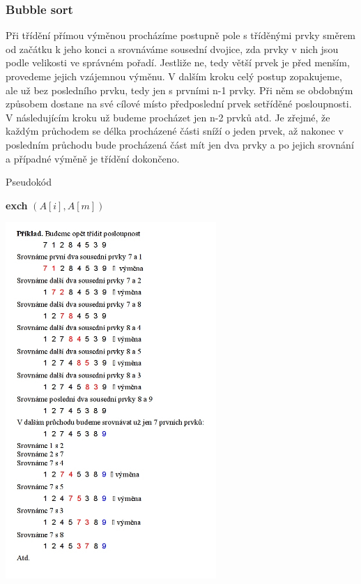 \documentclass[10pt,a4paper]{article}
\begin{document}
\subsubsection{Bubble sort}
Při třídění přímou výměnou procházíme postupně pole s tříděnými prvky směrem od začátku k jeho konci a srovnáváme sousední dvojice, zda prvky v nich jsou podle velikosti ve správném pořadí. Jestliže ne, tedy větší prvek je před menším, provedeme jejich vzájemnou výměnu. V dalším kroku celý postup zopakujeme, ale už bez posledního prvku, tedy jen s prvními n-1 prvky. Při něm se obdobným způsobem dostane na své cílové místo předposlední prvek setříděné posloupnosti. V následujícím kroku už budeme procházet jen n-2 prvků atd. Je zřejmé, že každým průchodem se délka procházené části sníží o jeden prvek, až nakonec v posledním průchodu bude procházená část mít jen dva prvky a po jejich srovnání a případné výměně je třídění dokončeno. \\
\begin{algorithm}
\caption{Pseudokód}
\begin{algorithmic}[]
			\State 	\textbf{exch} $(A[i], A[m])$
		\EndIf
	\EndFor
\EndFor
\EndProcedure
\end{algorithmic}
\end{algorithm}
\includegraphics[width=8cm]{img/bubble}
\end{document}
